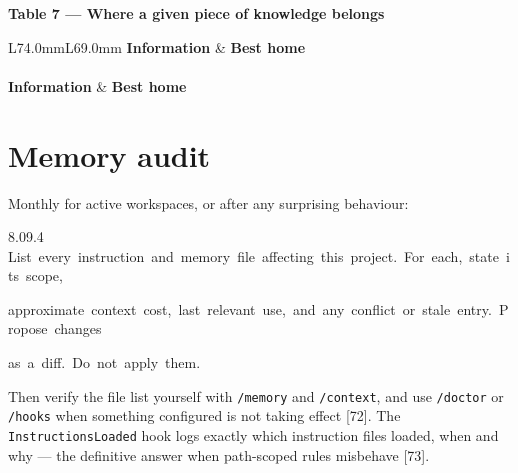 \documentclass[11pt,a4paper,twoside,openany]{book}
\newcommand{\cl}[1]{\noindent\mbox{#1}\par}
\newcommand{\tabcaption}[1]{\par\addvspace{2.6mm}\needspace{4\baselineskip}%
  {\sffamily\footnotesize\bfseries\color{deepindigo}#1\par}\addvspace{1.2mm}}
\begin{document}
  \tabcaption{Table 7 — Where a given piece of knowledge belongs}
  {\footnotesize\begin{longtable}{L{74.0mm}L{69.0mm}}
  \toprule
\textbf{Information} & \textbf{Best home} \\
\midrule\endfirsthead
  \\[1.2mm]
  \toprule
\textbf{Information} & \textbf{Best home} \\
\midrule\endhead
  \bottomrule\endfoot
  \bottomrule\endlastfoot
  \tblrows
  \end{longtable}}%
\else
  \noindent\tblbody
\fi
\par\addvspace{2.6mm}
\endgroup

\FloatBarrier
\setcounter{section}{3}
\section{Memory audit}

Monthly for active workspaces, or after any surprising behaviour:


\begin{codeblock}{8.0}{9.4}
\cl{List~every~instruction~and~memory~file~affecting~this~project.~For~each,~state~its~scope,}
\cl{approximate~context~cost,~last~relevant~use,~and~any~conflict~or~stale~entry.~Propose~changes}
\cl{as~a~diff.~Do~not~apply~them.}
\end{codeblock}

Then verify the file list yourself with \texttt{/\allowbreak{}memory} and \texttt{/\allowbreak{}context}, and use \texttt{/\allowbreak{}doctor} or \texttt{/\allowbreak{}hooks} when something configured is not taking effect [72]. The \texttt{Instruction\allowbreak{}s\allowbreak{}Loaded} hook logs exactly which instruction files loaded, when and why — the definitive answer when path-scoped rules misbehave [73].
\end{document}

